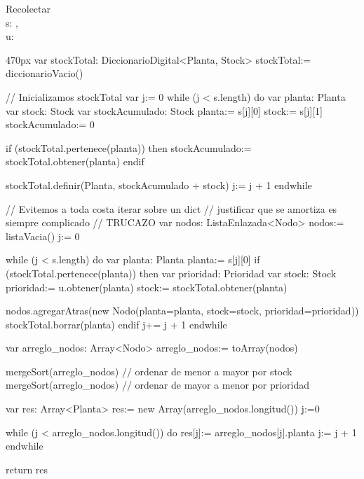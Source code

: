 \documentclass[10pt,a4paper]{article}
\begin{document}
\begin{proc}{Recolectar}{
  \\\Indent\In s: ,
  \\\Indent\In u: 
\\}{}
  \begin{ImplementationCode}{470px}
      var stockTotal: DiccionarioDigital<Planta, Stock>
          stockTotal:= diccionarioVacio()
    
      // Inicializamos stockTotal
      var j:= 0
      while (j < s.length) do
        var planta: Planta
        var stock: Stock
        var stockAcumulado: Stock
            planta:= s[j][0]
            stock:= s[j][1]
            stockAcumulado:= 0
    
        if (stockTotal.pertenece(planta)) then
            stockAcumulado:= stockTotal.obtener(planta)
        endif
    
        stockTotal.definir(Planta, stockAcumulado + stock)
        j:= j + 1
      endwhile
    
      // Evitemos a toda costa iterar sobre un dict
      // justificar que se amortiza es siempre complicado
      // TRUCAZO
      var nodos: ListaEnlazada<Nodo>
          nodos:= listaVacia()
          j:= 0
    
      while (j < s.length) do
        var planta: Planta
            planta:= s[j][0]
        if (stockTotal.pertenece(planta)) then
          var prioridad: Prioridad
          var stock: Stock
              prioridad:= u.obtener(planta)
              stock:= stockTotal.obtener(planta)
    
          nodos.agregarAtras(new Nodo(planta=planta, stock=stock, prioridad=prioridad))
          stockTotal.borrar(planta)
        endif
        j+= j + 1
      endwhile
    
      var arreglo_nodos: Array<Nodo>
          arreglo_nodos:= toArray(nodos)
      
      mergeSort(arreglo_nodos) // ordenar de menor a mayor por stock
      mergeSort(arreglo_nodos) // ordenar de mayor a menor por prioridad
    
    
      var res: Array<Planta>
          res:= new Array(arreglo_nodos.longitud())
          j:=0
    
      while (j < arreglo_nodos.longitud()) do
        res[j]:= arreglo_nodos[j].planta
        j:= j + 1
      endwhile
    
      return res
  \end{ImplementationCode}
\end{proc}
\end{document}
